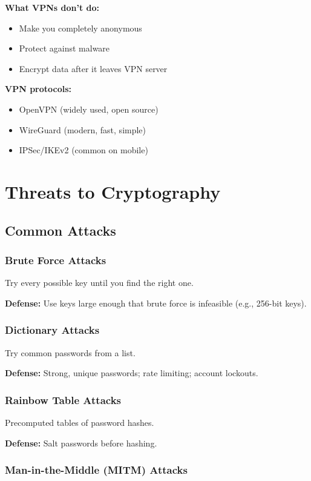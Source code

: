 \documentclass[11pt,a4paper]{report}
\begin{document}
\textbf{What VPNs don't do:}
\begin{itemize}
\item Make you completely anonymous
\item Protect against malware
\item Encrypt data after it leaves VPN server
\end{itemize}

\textbf{VPN protocols:}
\begin{itemize}
\item OpenVPN (widely used, open source)
\item WireGuard (modern, fast, simple)
\item IPSec/IKEv2 (common on mobile)
\end{itemize}

\newpage
\chapter{Threats to Cryptography}

\section{Common Attacks}

\subsection{Brute Force Attacks}

Try every possible key until you find the right one.

\textbf{Defense:} Use keys large enough that brute force is infeasible (e.g., 256-bit keys).

\subsection{Dictionary Attacks}

Try common passwords from a list.

\textbf{Defense:} Strong, unique passwords; rate limiting; account lockouts.

\subsection{Rainbow Table Attacks}

Precomputed tables of password hashes.

\textbf{Defense:} Salt passwords before hashing.

\subsection{Man-in-the-Middle (MITM) Attacks}
\end{document}
